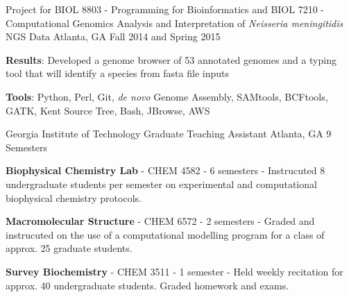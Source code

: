 \begin{cventries}
  \cventry
    {Project for BIOL 8803 - Programming for Bioinformatics and BIOL 7210 - Computational Genomics} %
    {Analysis and Interpretation of \textit{Neisseria meningitidis} NGS Data} %
    {Atlanta, GA} %
    {Fall 2014 and Spring 2015} %
    {
      \begin{cvitems} %
      	\item {\textbf{Results}: Developed a genome browser of 53 annotated genomes and a typing tool that will identify a species from fasta file inputs}
        \item {\textbf{Tools}: Python, Perl, Git, \textit{de novo} Genome Assembly, SAMtools, BCFtools, GATK, Kent Source Tree, Bash, JBrowse, AWS}
      \end{cvitems}
    }

  \cventry
    {Georgia Institute of Technology} %
    {Graduate Teaching Assistant} %
    {Atlanta, GA} %
    {9 Semesters} %
    {
      \begin{cvitems} %
        \item {\textbf{Biophysical Chemistry Lab} - CHEM 4582 - 6 semesters - Instrucuted 8 undergraduate students per semester on experimental and computational biophysical chemistry protocols.}
        \item {\textbf{Macromolecular Structure} - CHEM 6572 - 2 semesters - Graded and instrucuted on the use of a computational modelling program for a class of approx. 25 graduate students.}
        \item {\textbf{Survey Biochemistry} - CHEM 3511 - 1 semester - Held weekly recitation for approx. 40 undergraduate students. Graded homework and exams.}
      \end{cvitems}
    }


\end{cventries}
